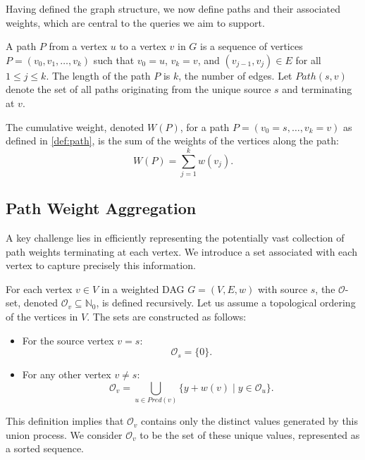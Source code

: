 Having defined the graph structure, we now define paths and their associated weights, which are central to the queries we aim to support.

\begin{definition}
    \label{def:path}
    A path $P$ from a vertex $u$ to a vertex $v$ in $G$ is a sequence of vertices $P = (v_0, v_1, \dots, v_k)$ such that $v_0 = u$, $v_k = v$, and $(v_{j-1}, v_j) \in E$ for all $1 \le j \le k$. The length of the path $P$ is $k$, the number of edges. Let $Path(s, v)$ denote the set of all paths originating from the unique source $s$ and terminating at $v$.
\end{definition}

\begin{definition}
    \label{def:paths_weights}
    The cumulative weight, denoted $W(P)$, for a path $P=(v_0=s, \dots, v_k=v)$ as defined in \ref{def:path}, is the sum of the weights of the vertices along the path:
    \[ W(P) = \sum_{j=1}^{k} w(v_j). \]
\end{definition}


\subsection{Path Weight Aggregation}
\label{subsec:o_set_def}

A key challenge lies in efficiently representing the potentially vast collection of path weights terminating at each vertex. We introduce a set associated with each vertex to capture precisely this information.

\begin{definition}
    \label{def:o_set}
    For each vertex $v \in V$ in a weighted DAG $G=(V, E, w)$ with source $s$, the $\mathcal{O}$-set, denoted $\mathcal{O}_v \subseteq \mathbb{N}_0$, is defined recursively. Let us assume a topological ordering of the vertices in $V$. The sets are constructed as follows:
    \begin{itemize}
        \item For the source vertex $v = s$:
              \[ \mathcal{O}_s = \{0\}. \]
        \item For any other vertex $v \neq s$:
              \[ \mathcal{O}_v = \bigcup_{u \in Pred(v)} \{ y + w(v) \mid y \in \mathcal{O}_u \}. \]
    \end{itemize}
\end{definition}
This definition implies that $\mathcal{O}_v$ contains only the distinct values generated by this union process. We consider $\mathcal{O}_v$ to be the set of these unique values, represented as a sorted sequence.


